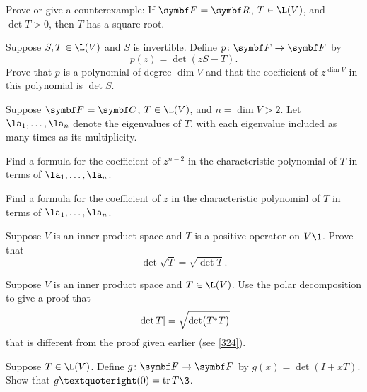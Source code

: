 \begin{exercises}
\exercise
Prove or give a counterexample: If $\F{} = \R{}$, $T \in \L(V)$, and $\det T > 0$, then $T$ has a square root.


\exercise
Suppose $S, T \in \L(V)$ and $S$ is invertible. Define $\fun p {\F{}} {\F{}}$ by
\[
p(z) = \det(zS - T).
\]
Prove that $p$ is a polynomial of degree $\dim V$ and that the coefficient of $z^{\dim V}$ in this polynomial is $\det S$.


\exercise
Suppose $\F{} = \C{}$, $T \in \L(V)$, and $n = \dim V > 2$. Let $\la_1, \ldots, \la_n$ denote the eigenvalues of $T$, with each eigenvalue included as many times as its multiplicity.
\begin{subtheorem}
\item
Find a formula for the coefficient of $z^{n-2}$ in the characteristic polynomial of $T$ in terms of
$\la_1, \ldots, \la_n$.
\item
Find a formula for the coefficient of $z$ in the characteristic polynomial of $T$ in terms of
$\la_1, \ldots, \la_n$.
\end{subtheorem}
\exercisesubtheoremend


\exercise
Suppose $V$ is an inner product space and $T$ is a positive operator on $V\1$. Prove that\label{9detsq}
\[
\det \sqrt{T} = \sqrt{ \det T }.
\]
\exercisedisplayend


\exercise
Suppose $V$ is an inner product space and $T \in \L(V)$. Use the polar decomposition to give a proof that
\[
\abs{\det T} = \sqrt{\det\paren[\big]{T^*T}}
\]
that is different from the proof given earlier (see \ref{324}).


\exercise
Suppose $T \in \L(V)$. Define $\fun g {\F{}} {\F{}}$ by
$
g(x) = \det(I + xT)$.
Show that $g’(0) = \tr T\3$.

\end{exercises}
